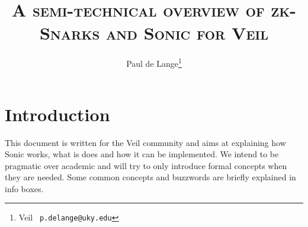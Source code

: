 \documentclass[11pt,oneside]{article}
\theoremstyle{definition}
\theoremstyle{remark}
\numberwithin{equation}{section}
\begin{document}

\title{ \vspace{-35pt} \textsc{\huge{{A} semi-technical overview of zk-{S}narks
and {S}onic for Veil\\} } }

\renewcommand{\thefootnote}{\fnsymbol{footnote}}
\renewcommand{\thefootnote}{\arabic{footnote}} 

\author{ Paul de Lange\footnote{ Veil \newline\indent{} {\tt
p.delange@uky.edu} } }

\maketitle


\clearpage

\tableofcontents

\clearpage

\section{Introduction}\label{sec:intro}
This document is written for the Veil community and aims at explaining how Sonic
works, what is does and how it can be implemented. We intend to be pragmatic
over academic and will try to only introduce formal concepts when they are
needed. Some common concepts and buzzwords are briefly explained in info boxes.

\clearpage
\end{document}
